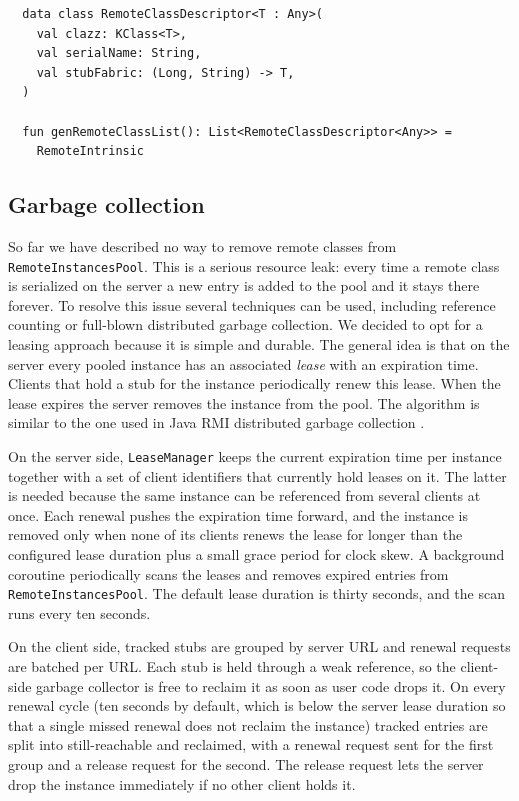 \documentclass[a4paper,11pt,oneside]{article}
\newcommand{\term}[1]{\textit{#1}}
\newcommand{\kotlini}[1]{\texttt{#1}}
\newcommand{\ki}[1]{\kotlini{#1}}
\begin{document}
\begin{listing}[!h]
  \begin{verbatim}
  data class RemoteClassDescriptor<T : Any>(
    val clazz: KClass<T>,
    val serialName: String,
    val stubFabric: (Long, String) -> T,
  )

  fun genRemoteClassList(): List<RemoteClassDescriptor<Any>> = 
    RemoteIntrinsic
  \end{verbatim}
  \caption{genRemoteClassList intrinsic}\label{gen_remote_class_list}
\end{listing}

\subsection{Garbage collection}\label{garbade_collection_section}

So far we have described no way to remove remote classes from \ki{RemoteInstancesPool}. This is a serious
resource leak: every time a remote class is serialized on the server a new entry is added to the
pool and it stays there forever. To resolve this issue several techniques can be used, including
reference counting or full-blown distributed garbage collection. We decided to opt for a leasing
approach because it is simple and durable. The general idea is that on the server
every pooled instance has an associated \term{lease} with an expiration time. Clients that hold a
stub for the instance periodically renew this lease. When the lease expires the server removes
the instance from the pool. The algorithm is similar to the one used in Java RMI distributed
garbage collection \cite{noauthor_java_nodate}.

On the server side, \ki{LeaseManager} keeps the current expiration time per instance together with a
set of client identifiers that currently hold leases on it. The latter is needed because the same
instance can be referenced from several clients at once. Each renewal pushes the expiration time
forward, and the instance is removed only when none of its clients renews the lease for longer than
the configured lease duration plus a small grace period for clock skew. A background coroutine
periodically scans the leases and removes expired entries from \ki{RemoteInstancesPool}. The default
lease duration is thirty seconds, and the scan runs every ten seconds.

On the client side, tracked stubs are grouped by server URL and renewal requests are batched per
URL. Each stub is held through a weak reference, so the client-side garbage collector is free to
reclaim it as soon as user code drops it. On every renewal cycle (ten seconds by default, which is
below the server lease duration so that a single missed renewal does not reclaim the instance) tracked
entries are split into still-reachable and reclaimed, with a renewal request sent for the first
group and a release request for the second. The release request lets the server drop the instance
immediately if no other client holds it.
\end{document}
